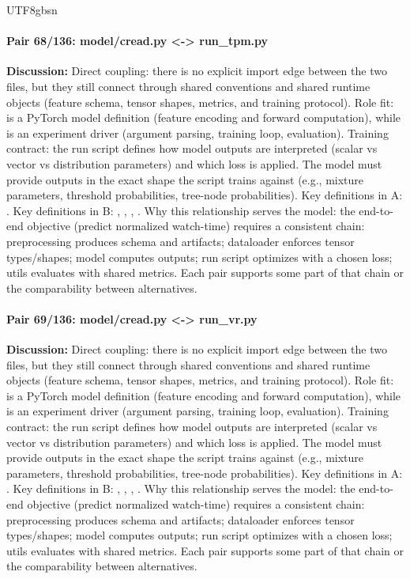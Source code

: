 \documentclass[11pt]{article}
\begin{document}
\begin{CJK*}{UTF8}{gbsn}
\paragraph{Pair 68/136: model/cread.py <-> run\_tpm.py}
\textbf{Discussion:} Direct coupling: there is no explicit import edge between the two files, but they still connect through shared conventions and shared runtime objects (feature schema, tensor shapes, metrics, and training protocol). Role fit: \texttt{} is a PyTorch model definition (feature encoding and forward computation), while \texttt{} is an experiment driver (argument parsing, training loop, evaluation). Training contract: the run script defines how model outputs are interpreted (scalar vs vector vs distribution parameters) and which loss is applied. The model must provide outputs in the exact shape the script trains against (e.g., mixture parameters, threshold probabilities, tree-node probabilities). Key definitions in A: \texttt{}. Key definitions in B: \texttt{}, \texttt{}, \texttt{}, \texttt{}. Why this relationship serves the model: the end-to-end objective (predict normalized watch-time) requires a consistent chain: preprocessing produces schema and artifacts; dataloader enforces tensor types/shapes; model computes outputs; run script optimizes with a chosen loss; utils evaluates with shared metrics. Each pair supports some part of that chain or the comparability between alternatives.

\paragraph{Pair 69/136: model/cread.py <-> run\_vr.py}
\textbf{Discussion:} Direct coupling: there is no explicit import edge between the two files, but they still connect through shared conventions and shared runtime objects (feature schema, tensor shapes, metrics, and training protocol). Role fit: \texttt{} is a PyTorch model definition (feature encoding and forward computation), while \texttt{} is an experiment driver (argument parsing, training loop, evaluation). Training contract: the run script defines how model outputs are interpreted (scalar vs vector vs distribution parameters) and which loss is applied. The model must provide outputs in the exact shape the script trains against (e.g., mixture parameters, threshold probabilities, tree-node probabilities). Key definitions in A: \texttt{}. Key definitions in B: \texttt{}, \texttt{}, \texttt{}, \texttt{}. Why this relationship serves the model: the end-to-end objective (predict normalized watch-time) requires a consistent chain: preprocessing produces schema and artifacts; dataloader enforces tensor types/shapes; model computes outputs; run script optimizes with a chosen loss; utils evaluates with shared metrics. Each pair supports some part of that chain or the comparability between alternatives.


\end{CJK*}
\end{document}
